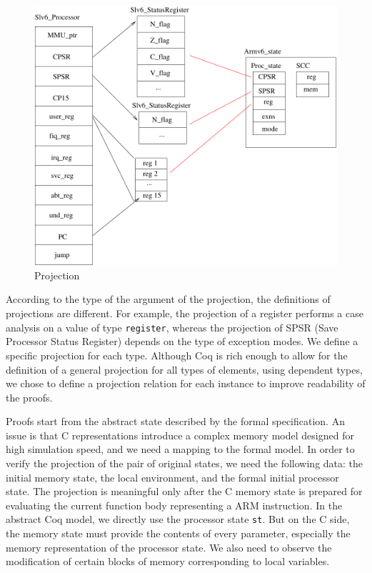 \documentclass[twocolumn]{article}
\begin{document}
\begin{figure}[h]
\hfil\includegraphics[width=.75\linewidth]{fig/projection.pdf}
\caption{Projection}
\label{fig:proj}
\end{figure}

According to the type of the argument of the projection, the
definitions of projections are different.  For example, the projection
of a register performs a case analysis on a value of type
\texttt{register}, whereas the projection of SPSR (Save Processor
Status Register) depends on the type of exception modes.  We define a
specific projection for each type.  Although Coq is rich enough to
allow for the definition of a general projection for all types of
elements, using dependent types, we chose to define a projection
relation for each instance to improve readability of the proofs.

Proofs start from the abstract state described by the formal
specification.  An issue is that C representations introduce a complex
memory model designed for high simulation speed, and we need a mapping
to the formal model. In order to verify the projection of the pair of
original states, we need the following data: the initial memory state,
the local environment, and the formal initial processor state.  The
projection is meaningful only after the C memory state is prepared for
evaluating the current function body representing a ARM instruction.
In the abstract Coq model, we directly use the processor state
\texttt{st}.  But on the C side, the memory state must provide the
contents of every parameter, especially the memory representation of
the processor state.  We also need to observe the modification of
certain blocks of memory corresponding to local variables.
\end{document}
